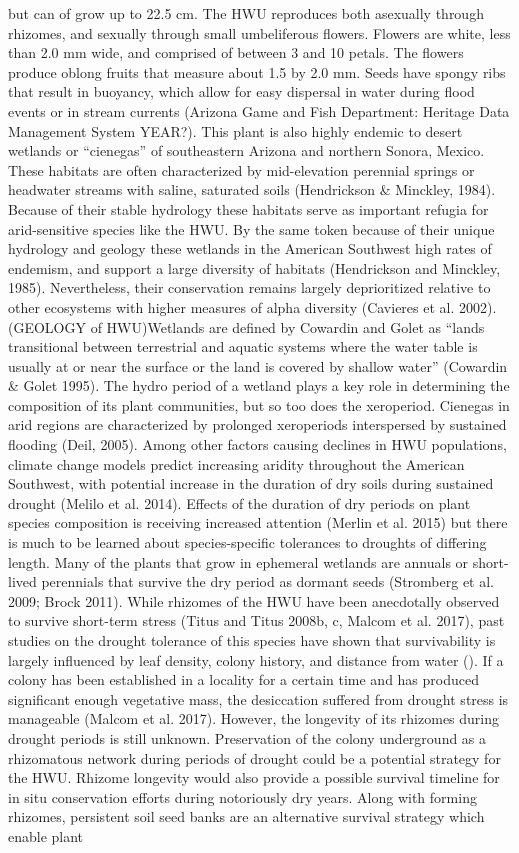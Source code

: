 \documentclass[twocolumn]{article}
\begin{document}
but can of grow up to 22.5 cm. The HWU reproduces both asexually through rhizomes, and sexually through small umbeliferous flowers. Flowers are white, less than 2.0 mm wide, and comprised of between 3 and 10 petals. The flowers produce oblong fruits that measure about 1.5 by 2.0 mm.  Seeds have spongy ribs that result in buoyancy, which allow for easy dispersal in water during flood events or in stream currents (Arizona Game and Fish Department: Heritage Data Management System YEAR?). This plant is also highly endemic to desert wetlands or “cienegas” of southeastern Arizona and northern Sonora, Mexico. These habitats are often characterized by mid-elevation perennial springs or headwater streams with saline, saturated soils (Hendrickson & Minckley, 1984). Because of their stable hydrology these habitats serve as important refugia for arid-sensitive species like the HWU. By the same token because of their unique hydrology and geology these wetlands in the American Southwest high rates of endemism, and support a large diversity of habitats (Hendrickson and Minckley, 1985). Nevertheless, their conservation remains largely deprioritized relative to other ecosystems with higher measures of alpha diversity (Cavieres et al. 2002). (GEOLOGY of HWU)Wetlands are defined by Cowardin and Golet as “lands transitional between terrestrial and aquatic systems where the water table is usually at or near the surface or the land is covered by shallow water” (Cowardin & Golet 1995). The hydro period of a wetland plays a key role in determining the composition of its plant communities, but so too does the xeroperiod. Cienegas in arid regions are characterized by prolonged xeroperiods interspersed by sustained flooding (Deil, 2005). Among other factors causing declines in HWU populations, climate change models predict increasing aridity throughout the American Southwest, with potential increase in the duration of dry soils during sustained drought (Melilo et al. 2014).  Effects of the duration of dry periods on plant species composition is receiving increased attention (Merlin et al. 2015) but there is much to be learned about species-specific tolerances to droughts of differing length. Many of the plants that grow in ephemeral wetlands are annuals or short-lived perennials that survive the dry period as dormant seeds (Stromberg et al. 2009; Brock 2011).  While rhizomes of the HWU have been anecdotally observed to survive short-term stress (Titus and Titus 2008b, c, Malcom et al. 2017), past studies on the drought tolerance of this species have shown that survivability is largely influenced by leaf density, colony history, and distance from water (). If a colony has been established in a locality for a certain time and has produced significant enough vegetative mass, the desiccation suffered from drought stress is manageable (Malcom et al. 2017). However, the longevity of its rhizomes during drought periods is still unknown. Preservation of the colony underground as a rhizomatous network during periods of drought could be a potential strategy for the HWU. Rhizome longevity would also provide a possible survival timeline for in situ conservation efforts during notoriously dry years. Along with forming rhizomes, persistent soil seed banks are an alternative survival strategy which enable plant 
\end{document}
